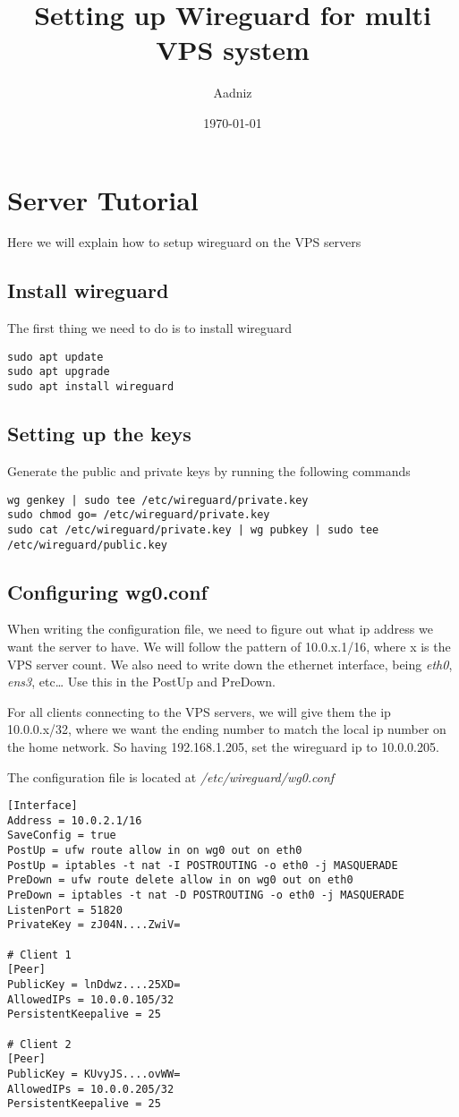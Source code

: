 \documentclass[letterpaper, 11pt]{article}
\author{Aadniz}
\date{\today}
\title{Setting up Wireguard for multi VPS system}
\begin{document}
\maketitle
\tableofcontents

\newpage

\section{Server Tutorial}
\label{sec:orgf9d647a}
Here we will explain how to setup wireguard on the VPS servers

\subsection{Install wireguard}
\label{sec:org51529d2}
The first thing we need to do is to install wireguard

\begin{verbatim}
sudo apt update
sudo apt upgrade
sudo apt install wireguard
\end{verbatim}

\subsection{Setting up the keys}
\label{sec:org00284c5}
Generate the public and private keys by running the following commands
\begin{verbatim}
wg genkey | sudo tee /etc/wireguard/private.key
sudo chmod go= /etc/wireguard/private.key
sudo cat /etc/wireguard/private.key | wg pubkey | sudo tee /etc/wireguard/public.key
\end{verbatim}


\subsection{Configuring wg0.conf}
\label{sec:org34e985f}
When writing the configuration file, we need to figure out what ip address we want the server to have.
We will follow the pattern of 10.0.x.1/16, where x is the VPS server count.
We also need to write down the ethernet interface, being \textit{eth0}, \textit{ens3}, etc\ldots{}
Use this in the PostUp and PreDown.

For all clients connecting to the VPS servers, we will give them the ip 10.0.0.x/32, where we want the ending number to match the local ip number on the home network.
So having 192.168.1.205, set the wireguard ip to 10.0.0.205.

The configuration file is located at \textit{/etc/wireguard/wg0.conf}
\begin{verbatim}
[Interface]
Address = 10.0.2.1/16
SaveConfig = true
PostUp = ufw route allow in on wg0 out on eth0
PostUp = iptables -t nat -I POSTROUTING -o eth0 -j MASQUERADE
PreDown = ufw route delete allow in on wg0 out on eth0
PreDown = iptables -t nat -D POSTROUTING -o eth0 -j MASQUERADE
ListenPort = 51820
PrivateKey = zJ04N....ZwiV=

# Client 1
[Peer]
PublicKey = lnDdwz....25XD=
AllowedIPs = 10.0.0.105/32
PersistentKeepalive = 25

# Client 2
[Peer]
PublicKey = KUvyJS....ovWW=
AllowedIPs = 10.0.0.205/32
PersistentKeepalive = 25
\end{verbatim}
\end{document}
